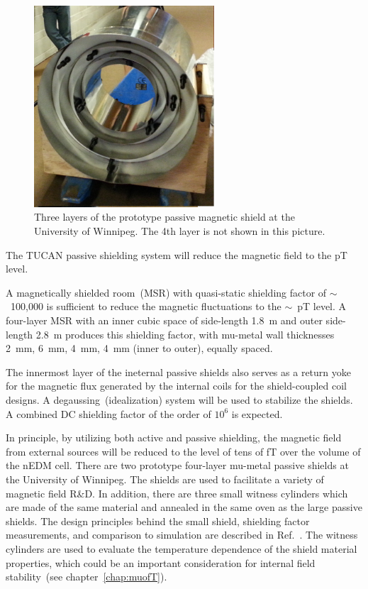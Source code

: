 \begin{figure}[h!]
  \centering
  \includegraphics[width=0.6\textwidth]{prototype_shields.png}
  \caption[TUCAN's prototype passive shielding]{Three layers of the
    prototype passive magnetic shield at the University of
    Winnipeg. The 4th layer is not shown in this picture.}
  \label{fig:prototype_shields}
\end{figure}


The TUCAN passive shielding system will reduce the magnetic field to
the pT level.

A magnetically shielded room~(MSR) with quasi-static
shielding factor of $\sim$~100,000 is sufficient to reduce the magnetic
fluctuations to the $\sim$~pT level. A four-layer MSR with an inner
cubic space of side-length 1.8~m and outer side-length 2.8~m produces
this shielding factor, with mu-metal wall thicknesses 2~mm, 6~mm,
4~mm, 4~mm (inner to outer), equally spaced.


The innermost layer of the ineternal passive shields also serves as a
return yoke for the magnetic flux generated by the internal coils for
the shield-coupled coil designs. A degaussing~(idealization) system
will be used to stabilize the shields. A combined DC shielding factor
of the order of $10^6$ is expected.


In principle, by utilizing both active and passive shielding, the
magnetic field from external sources will be reduced to the level of
tens of fT over the volume of the nEDM cell.  There are two prototype
four-layer mu-metal passive shields at the University of Winnipeg. The
shields are used to facilitate a variety of magnetic field R\&D. In
addition, there are three small witness cylinders which are made of
the same material and annealed in the same oven as the large passive
shields. The design principles behind the small shield, shielding
factor measurements, and comparison to simulation are described in
Ref.~\cite{martin2015large}.  The witness cylinders are used to
evaluate the temperature dependence of the shield material properties,
which could be an important consideration for internal field
stability~(see chapter~\ref{chap:muofT}).


